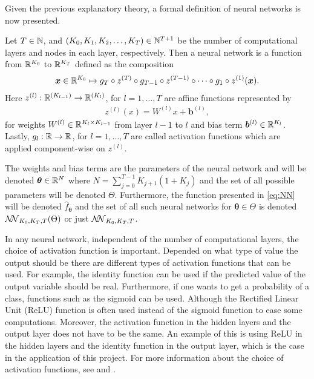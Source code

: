 Given the previous explanatory theory, a formal definition of neural networks is now presented.
\begin{defn}\label{def:NN}
    Let $T \in \mathbb{N}$, and $(K_0, K_1, K_2, \ldots, K_T) \in\mathbb{N}^{T+1}$ be the number of computational layers and nodes in each layer, respectively. Then a neural network is a function from $\mathbb{R}^{K_0}$ to $\mathbb{R}^{K_T}$ defined as the composition
    \begin{align}\label{eq:NN}
        \bm x \in \mathbb{R}^{K_0} \mapsto g_T \circ z^{(T)} \circ g_{T-1} \circ z^{(T-1)} \circ \cdots \circ g_1 \circ z^{(1)}(\bm x).
    \end{align}
    Here $z^{(l)}: \mathbb{R}^{(K_{l-1})} \to \mathbb{R}^{(K_l)}$, for $l = 1, \ldots, T$ are affine functions represented by 
    \begin{align*}
        z^{(l)}(x) = W^{(l)} x + \bm{b}^{(l)},
    \end{align*}
    for weights $W^{(l)} \in \mathbb{R}^{K_l\times K_{l-1}}$ from layer $l-1$ to $l$ and bias term $\bm{b}^{(l)} \in \mathbb{R}^{K_l}$. Lastly, $g_l: \mathbb{R} \to \mathbb{R}$, for $l = 1, \ldots, T$ are called activation functions which are applied component-wise on $z^{(l)}$.
\end{defn} 

The weights and bias terms are the parameters of the neural network and will be denoted $\bm{\theta} \in \mathbb{R}^{N}$ where $N = \sum_{j = 0}^{T-1} K_{j+1}(1+K_{j})$ and the set of all possible parameters will be denoted $\Theta$. Furthermore, the function presented in \eqref{eq:NN} will be denoted $\hat{f}_{\bm{\theta}}$ and the set of all such neural networks for $\bm{\theta} \in \Theta$ is denoted $\mathcal{N\mkern-5mu N}_{K_0, K_T, T}(\Theta)$ or just $\mathcal{N\mkern-5mu N}_{K_0, K_T, T}$.

In any neural network, independent of the number of computational layers, the choice of activation function is important. Depended on what type of value the output should be there are different types of activation functions that can be used. For example, the identity function can be used if the predicted value of the output variable should be real. Furthermore, if one wants to get a probability of a class, functions such as the sigmoid can be used. Although the Rectified Linear Unit (ReLU) function is often used instead of the sigmoid function to ease some computations. Moreover, the activation function in the hidden layers and the output layer does not have to be the same. An example of this is using ReLU in the hidden layers and the identity function in the output layer, which is the case in the application of this project. For more information about the choice of activation functions, see \citep[p. 2-6]{NNDesign} and \citep[p. 11-13]{NNDL}.


